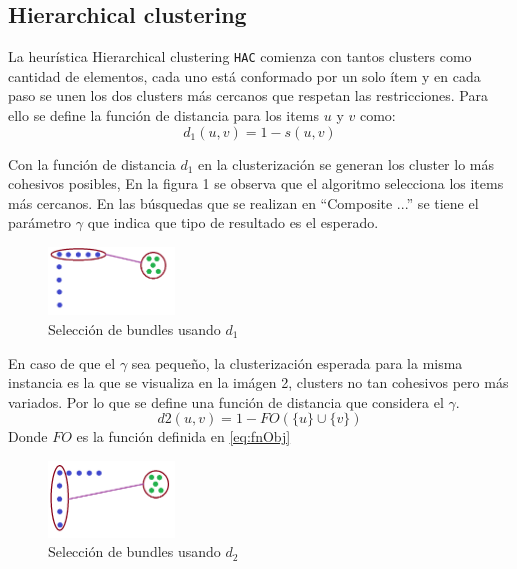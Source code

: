 \subsection{Hierarchical clustering}
La heurística Hierarchical clustering \texttt{HAC} comienza con tantos clusters como cantidad de elementos, cada uno está 
conformado por un solo ítem y en cada paso se unen los dos clusters más cercanos que respetan las restricciones. 
Para ello se define la función de distancia para los items $u$ y $v$ como:\\
\begin{equation}
d_{1}(u,v) = 1 - s(u, v)
\end{equation}

Con la función de distancia $d_{1}$ en la clusterización se generan los cluster lo más cohesivos posibles,
En la figura 1 se observa que el algoritmo selecciona los items más cercanos. En las búsquedas que 
se realizan en ``Composite ...''\cite{compositeRetrival} se tiene el parámetro $\gamma$ que indica 
que tipo de resultado es el esperado. 

\begin{figure}[H]
  \centering
    \includegraphics[width=0.3\textwidth]{img/cluster2.png}
  \caption{Selección de bundles usando $d_{1}$}
  \label{res:img-usingEfficientHAC}
\end{figure}

En caso de que el $\gamma$ sea pequeño, la 
clusterización esperada para la misma instancia es la que se visualiza en la imágen 2, clusters no 
tan cohesivos pero más variados. Por lo que se define una función de distancia que considera el 
$\gamma$.\\
\begin{equation}
d2(u,v) = 1 - FO(\{u\} \cup \{v\})
\end{equation}
Donde $FO$ es la función definida en \eqref{eq:fnObj} \\

\begin{figure}[H]
  \centering
    \includegraphics[width=0.3\textwidth]{img/cluster1.png}
  \caption{Selección de bundles usando $d_{2}$}
  \label{res:img-usingSingleHAC}
\end{figure}

